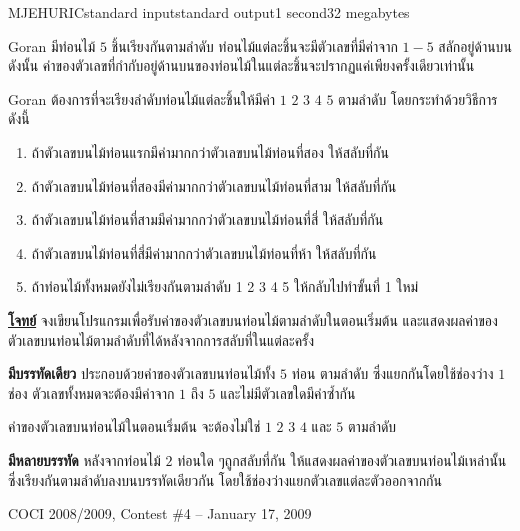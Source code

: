 \documentclass[11pt,a4paper]{article}
\begin{document}
\begin{problem}{MJEHURIC}{standard input}{standard output}{1 second}{32 megabytes}

Goran มีท่อนไม้ $5$ ชิ้นเรียงกันตามลำดับ ท่อนไม้แต่ละชิ้นจะมีตัวเลขที่มีค่าจาก $1-5$ สลักอยู่ด้านบน ดังนั้น ค่าของตัวเลขที่กำกับอยู่ด้านบนของท่อนไม้ในแต่ละชิ้นจะปรากฏแค่เพียงครั้งเดียวเท่านั้น

Goran ต้องการที่จะเรียงลำดับท่อนไม้แต่ละชิ้นให้มีค่า $1$ $2$ $3$ $4$ $5$ ตามลำดับ โดยกระทำด้วยวิธีการดังนี้
\begin{enumerate}  
\item ถ้าตัวเลขบนไม้ท่อนแรกมีค่ามากกว่าตัวเลขบนไม้ท่อนที่สอง   ให้สลับที่กัน
\item ถ้าตัวเลขบนไม้ท่อนที่สองมีค่ามากกว่าตัวเลขบนไม้ท่อนที่สาม   ให้สลับที่กัน
\item ถ้าตัวเลขบนไม้ท่อนที่สามมีค่ามากกว่าตัวเลขบนไม้ท่อนที่สี่   ให้สลับที่กัน
\item ถ้าตัวเลขบนไม้ท่อนที่สี่มีค่ามากกว่าตัวเลขบนไม้ท่อนที่ห้า   ให้สลับที่กัน
\item ถ้าท่อนไม้ทั้งหมดยังไม่เรียงกันตามลำดับ 1 2 3 4 5   ให้กลับไปทำขั้นที่ 1 ใหม่

\end{enumerate}

\bigskip
\underline{\textbf{โจทย์}}  จงเขียนโปรแกรมเพื่อรับค่าของตัวเลขบนท่อนไม้ตามลำดับในตอนเริ่มต้น และแสดงผลค่าของตัวเลขบนท่อนไม้ตามลำดับที่ได้หลังจากการสลับที่ในแต่ละครั้ง


\InputFile

\textbf{มีบรรทัดเดียว}   ประกอบด้วยค่าของตัวเลขบนท่อนไม้ทั้ง $5$ ท่อน ตามลำดับ ซึ่งแยกกันโดยใช้ช่องว่าง $1$ ช่อง ตัวเลขทั้งหมดจะต้องมีค่าจาก $1$ ถึง $5$ และไม่มีตัวเลขใดมีค่าซ้ำกัน

ค่าของตัวเลขบนท่อนไม้ในตอนเริ่มต้น จะต้องไม่ใช่ $1$ $2$ $3$ $4$ และ $5$ ตามลำดับ


\OutputFile

\textbf{มีหลายบรรทัด} หลังจากท่อนไม้ $2$ ท่อนใด ๆถูกสลับที่กัน   ให้แสดงผลค่าของตัวเลขบนท่อนไม้เหล่านั้นซึ่งเรียงกันตามลำดับลงบนบรรทัดเดียวกัน โดยใช้ช่องว่างแยกตัวเลขแต่ละตัวออกจากกัน

\Examples

\begin{example}
%
%
\end{example}

  
\Source

COCI 2008/2009, Contest \#4 – January 17, 2009

\end{problem}
\end{document}
